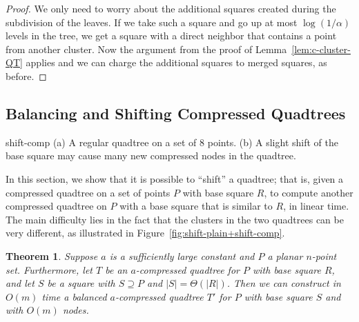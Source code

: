 \documentclass[11pt]{paper}
\newtheorem {theorem} {Theorem}[section]
\begin{document}
  \begin{proof}
    We only need to worry about the additional squares created during the
    subdivision of the leaves. If we take such a square and go up
    at most $\log(1/\alpha)$ levels in the tree, we get a square with a direct
    neighbor that contains a point from another cluster. Now the 
    argument from the proof of Lemma~\ref{lem:c-cluster-QT} applies
    and we can charge the additional squares to merged squares, as before.
  \end{proof}
  \subsection{Balancing and Shifting Compressed Quadtrees}
    \label{sec:shiftbalance}

 {shift-comp}
{
  (a) A regular quadtree on a set of $8$ points.
  (b) A slight shift of the base square may cause many new compressed nodes in the quadtree.
}

    In this section, we show that it is possible to ``shift'' a quadtree; that is, given a compressed quadtree on a set of points $P$ with base square $R$, to compute another compressed quadtree on $P$ with a base square that is similar to $R$, in linear time.
    The main difficulty lies in the fact that the clusters in the two quadtrees can be very different, as illustrated in Figure~\ref {fig:shift-plain+shift-comp}.

    \begin {theorem} \label {thm:shiftbalance}
      Suppose $a$ is a sufficiently large constant and
      $P$ a planar $n$-point set.
      Furthermore, let $T$ be an $a$-compressed quadtree
      for $P$ with base square $R$, and let $S$ be a square with
      $S \supseteq P$ and $|S| = \Theta(|R|)$. 
      Then we can construct in $O(m)$ time a balanced $a$-compressed quadtree $T'$
      for $P$ with base square $S$ and with $O(m)$ nodes.
    \end {theorem}
\end{document}
